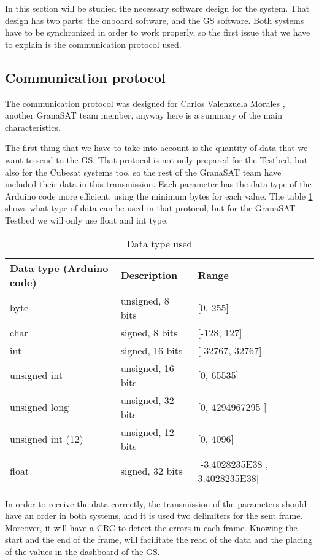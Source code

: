 In this section will be studied the necessary software design for the system. That design has two parts: the onboard software, and the \acrshort{GS} software. Both systems have to be synchronized in order to work properly, so the first issue that we have to explain is the communication protocol used.

\subsection{Communication protocol} \label{ssec:protocol}
The communication protocol was designed for Carlos Valenzuela Morales \cite{carlos}, another GranaSAT team member, anyway here is a summary of the main characteristics.

The first thing that we have to take into account is the quantity of data that we want to send to the \acrshort{GS}. That protocol is not only  prepared for the Testbed, but also for the Cubesat systems too, so the rest of the GranaSAT team have included their data in this transmission. Each parameter has the data type of the Arduino code more efficient, using the minimum bytes for each value. The table \ref{tab:bits} shows what type of data can be used in that protocol, but for the GranaSAT Testbed we will only use float and int type.


\begin{table}[H]
\centering
\begin{tabular}{|l|l|l|}
\hline\hline
\textbf{Data type (Arduino code)}		 & \textbf{Description}	& \textbf{Range}\\ \hline
byte		& unsigned, 8 bits & [0, 255] \\ \hline
char   & signed, 8 bits  & [-128, 127]     \\ \hline
int    & signed, 16 bits & [-32767, 32767]       \\ \hline
unsigned int     & unsigned, 16 bits & [0, 65535]    \\ \hline
unsigned long    & unsigned, 32 bits & [0, 4294967295 ]  \\ \hline
unsigned int (12)    & unsigned, 12 bits & [0, 4096]    \\ \hline
float    & signed, 32 bits & [-3.4028235E38 , 3.4028235E38]    \\ \hline
\hline
\end{tabular}
\caption{Data type used \cite{carlos}}\label{tab:bits}
\end{table}

In order to receive the data correctly, the transmission of the parameters should have an order in both systems, and it is used two delimiters for the sent frame. Moreover, it will have a CRC to detect the errors in each frame. Knowing the start and the end of the frame, will facilitate the read of the data and the placing of the values in the dashboard of the \acrshort{GS}.

